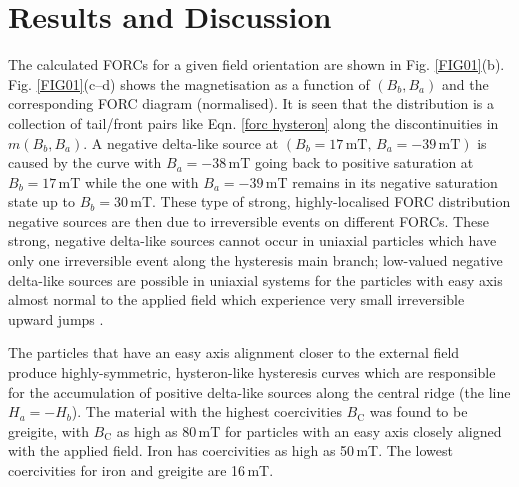 \section{Results and Discussion}
The calculated FORCs for a given field orientation are shown in Fig. \ref{FIG01}(b). Fig. \ref{FIG01}(c--d) shows the magnetisation as a function of $(B_b, B_a)$ and the corresponding FORC diagram (normalised). It is seen that the distribution is a collection of tail/front pairs like Eqn. \ref{forc hysteron} along the discontinuities in $m(B_b, B_a)$. A negative delta-like source at $(B_b=17\,\mathrm{mT},\,B_a=-39\,\mathrm{mT})$ is caused by the curve with $B_a=-38\,$mT going back to positive saturation at $B_b=17\,$mT while the one with $B_a=-39\,$mT remains in its negative saturation state up to $B_b=30\,$mT. These type of strong, highly-localised FORC distribution negative sources are then due to irreversible events on different FORCs. These strong, negative delta-like sources cannot occur in uniaxial particles which have only one irreversible event along the hysteresis main branch; low-valued negative delta-like sources are possible in uniaxial systems for the particles with easy axis almost normal to the applied field which experience very small irreversible upward jumps \citep{Stoner1948,Newell2005}.\par

The particles that have an easy axis alignment closer to the external field produce highly-symmetric, hysteron-like hysteresis curves which are responsible for the accumulation of positive delta-like sources along the central ridge (the line $H_a=-H_b$). The material with the highest coercivities $B_\text{C}$ was found to be greigite, with $B_\text{C}$ as high as 80$\,$mT for particles with an easy axis closely aligned with the applied field. Iron has coercivities as high as 50$\,$mT. The lowest coercivities for iron and greigite are 16$\,$mT.\par


